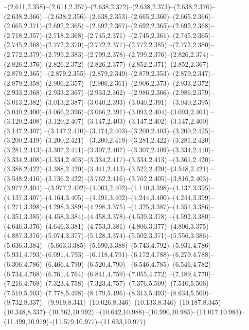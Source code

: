   --(2.611,2.358)--(2.611,2.357)--(2.638,2.372)--(2.638,2.373)--(2.638,2.376)--(2.638,2.366)%
  --(2.638,2.356)--(2.638,2.353)--(2.665,2.360)--(2.665,2.366)--(2.665,2.371)--(2.692,2.365)%
  --(2.692,2.367)--(2.692,2.365)--(2.692,2.368)--(2.718,2.357)--(2.718,2.368)--(2.745,2.371)%
  --(2.745,2.361)--(2.745,2.365)--(2.745,2.368)--(2.772,2.370)--(2.772,2.377)--(2.772,2.385)%
  --(2.772,2.380)--(2.772,2.379)--(2.799,2.383)--(2.799,2.378)--(2.799,2.376)--(2.826,2.374)%
  --(2.826,2.376)--(2.826,2.372)--(2.826,2.377)--(2.852,2.371)--(2.852,2.367)--(2.879,2.365)%
  --(2.879,2.355)--(2.879,2.349)--(2.879,2.353)--(2.879,2.347)--(2.879,2.358)--(2.906,2.357)%
  --(2.906,2.361)--(2.906,2.373)--(2.933,2.372)--(2.933,2.368)--(2.933,2.367)--(2.933,2.362)%
  --(2.986,2.366)--(2.986,2.379)--(3.013,2.382)--(3.013,2.387)--(3.040,2.393)--(3.040,2.391)%
  --(3.040,2.395)--(3.040,2.400)--(3.066,2.396)--(3.066,2.391)--(3.093,2.404)--(3.093,2.401)%
  --(3.120,2.408)--(3.120,2.407)--(3.147,2.403)--(3.147,2.402)--(3.147,2.400)--(3.147,2.407)%
  --(3.147,2.410)--(3.174,2.403)--(3.200,2.403)--(3.200,2.425)--(3.200,2.419)--(3.200,2.421)%
  --(3.200,2.419)--(3.281,2.422)--(3.281,2.420)--(3.281,2.413)--(3.307,2.411)--(3.307,2.407)%
  --(3.307,2.409)--(3.334,2.410)--(3.334,2.408)--(3.334,2.403)--(3.334,2.417)--(3.334,2.413)%
  --(3.361,2.420)--(3.388,2.422)--(3.388,2.420)--(3.441,2.413)--(3.522,2.420)--(3.548,2.421)%
  --(3.548,2.416)--(3.736,2.422)--(3.762,2.416)--(3.762,2.405)--(3.816,2.403)--(3.977,2.404)%
  --(3.977,2.402)--(4.003,2.402)--(4.110,3.398)--(4.137,3.395)--(4.137,3.407)--(4.164,3.405)%
  --(4.191,3.402)--(4.244,3.400)--(4.244,3.399)--(4.271,3.398)--(4.298,3.389)--(4.298,3.375)%
  --(4.325,3.387)--(4.351,3.386)--(4.351,3.385)--(4.458,3.384)--(4.458,3.378)--(4.539,3.378)%
  --(4.592,3.380)--(4.646,3.376)--(4.646,3.381)--(4.753,3.381)--(4.806,3.377)--(4.806,3.375)%
  --(4.887,3.376)--(5.074,3.377)--(5.128,3.374)--(5.502,3.371)--(5.556,3.386)--(5.636,3.384)%
  --(5.663,3.385)--(5.690,3.388)--(5.743,4.792)--(5.931,4.786)--(5.931,4.793)--(6.091,4.793)%
  --(6.118,4.791)--(6.172,4.788)--(6.279,4.788)--(6.306,4.786)--(6.466,4.790)--(6.520,4.790)%
  --(6.546,4.785)--(6.546,4.782)--(6.734,4.768)--(6.761,4.764)--(6.841,4.759)--(7.055,4.772)%
  --(7.189,4.770)--(7.216,4.768)--(7.323,4.758)--(7.323,4.757)--(7.376,5.509)--(7.510,5.506)%
  --(7.510,5.503)--(7.778,5.498)--(8.179,5.496)--(8.313,5.493)--(8.634,5.500)--(9.732,8.337)%
  --(9.919,8.341)--(10.026,8.346)--(10.133,8.346)--(10.187,8.345)--(10.348,8.337)--(10.562,10.992)%
  --(10.642,10.988)--(10.990,10.985)--(11.017,10.983)--(11.499,10.979)--(11.579,10.977)--(11.633,10.977)%
